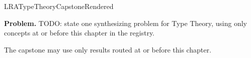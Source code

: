 \ifcsname LRATypeTheoryCapstoneRendered\endcsname
\else
\expandafter\gdef\csname LRATypeTheoryCapstoneRendered\endcsname{}

\newpage
{}
\label{cap:type-theory}

\begin{tcolorbox}[
  colback=gray!6,
  colframe=gray!40,
  arc=2pt,
  left=8pt, right=8pt, top=6pt, bottom=6pt,
  title={\small\textbf{Capstone Problem}},
  fonttitle=\small\bfseries
]
\textbf{Problem.}
TODO: state one synthesizing problem for Type Theory, using only concepts at or
before this chapter in the registry.
\end{tcolorbox}

\begin{remark*}
The capstone may use only results routed at or before this chapter.
\end{remark*}

\clearpage
\fi

